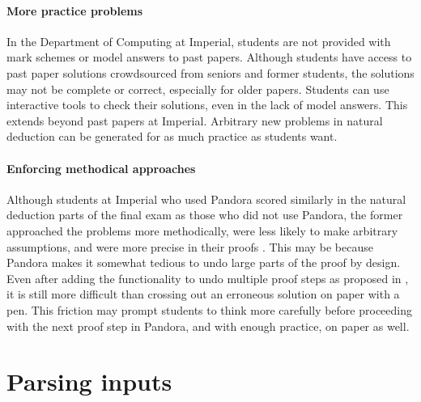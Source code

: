 \paragraph{More practice problems}
In the Department of Computing at Imperial, students are not provided with mark schemes or model answers to past papers. Although students have access to past paper solutions crowdsourced from seniors and former students, the solutions may not be complete or correct, especially for older papers. Students can use interactive tools to check their solutions, even in the lack of model answers. This extends beyond past papers at Imperial. Arbitrary new problems in natural deduction can be generated \cite{ahmed:2013} for as much practice as students want.

\paragraph{Enforcing methodical approaches}
Although students at Imperial who used Pandora scored similarly in the natural deduction parts of the final exam as those who did not use Pandora, the former approached the problems more methodically, were less likely to make arbitrary assumptions, and were more precise in their proofs \cite{pandora:2007}. This may be because Pandora makes it somewhat tedious to undo large parts of the proof by design. Even after adding the functionality to undo multiple proof steps as proposed in \cite{pandora:2007}, it is still more difficult than crossing out an erroneous solution on paper with a pen. This friction may prompt students to think more carefully before proceeding with the next proof step in Pandora, and with enough practice, on paper as well.

\section{Parsing inputs}

